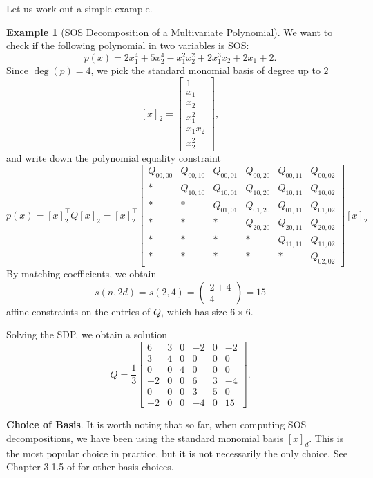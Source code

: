 \documentclass[
]{book}
\theoremstyle{definition}
\theoremstyle{definition}
\newtheorem{example}{Example}[chapter]
\theoremstyle{definition}
\theoremstyle{definition}
\theoremstyle{remark}
\begin{document}
Let us work out a simple example.

\begin{example}[SOS Decomposition of a Multivariate Polynomial]
\protect\hypertarget{exm:SOSDecompositionMultivariate}{}\label{exm:SOSDecompositionMultivariate}We want to check if the following polynomial in two variables is SOS:
\[
p(x) = 2 x_1^4 + 5 x_2^4 - x_1^2 x_2^2 + 2 x_1^3 x_2 + 2 x_1 + 2.
\]
Since \(\deg(p) = 4\), we pick the standard monomial basis of degree up to \(2\)
\[
[x]_2 = \begin{bmatrix} 1 \\ x_1 \\ x_2 \\ x_1^2 \\ x_1 x_2 \\ x_2^2 \end{bmatrix},
\]
and write down the polynomial equality constraint
\[
p(x) = [x]_2^\top Q [x]_2 = 
[x]_2^\top\begin{bmatrix}
Q_{00,00} & Q_{00,10} & Q_{00,01} & Q_{00,20} & Q_{00,11} & Q_{00,02} \\
* & Q_{10,10} & Q_{10,01} & Q_{10,20} & Q_{10,11} & Q_{10,02} \\
* & * & Q_{01,01} & Q_{01,20} & Q_{01,11} & Q_{01,02} \\
* & * & * & Q_{20,20} & Q_{20,11} & Q_{20,02} \\
* & * & * & * & Q_{11,11} & Q_{11,02} \\
* & * & * & * & * & Q_{02,02}
\end{bmatrix}
[x]_2
\]
By matching coefficients, we obtain
\[
s(n,2d) = s(2,4) = \begin{pmatrix} 2 + 4 \\ 4 \end{pmatrix} = 15
\]
affine constraints on the entries of \(Q\), which has size \(6 \times 6\).

Solving the SDP, we obtain a solution
\[
Q = \frac{1}{3} \begin{bmatrix} 6 & 3 & 0 & -2 & 0 & -2 \\
3 & 4 & 0 & 0 & 0 & 0 \\
0 & 0 & 4 & 0 & 0 & 0 \\
-2 & 0 & 0 & 6 & 3 & -4 \\
0 & 0 & 0 & 3 & 5 & 0 \\
-2 & 0 & 0 & -4 & 0 & 15
\end{bmatrix}.
\]
\end{example}

\textbf{Choice of Basis}. It is worth noting that so far, when computing SOS decompositions, we have been using the standard monomial basis \([x]_d\). This is the most popular choice in practice, but it is not necessarily the only choice. See Chapter 3.1.5 of \citep{blekherman12book-semidefinite} for other basis choices.
\end{document}
